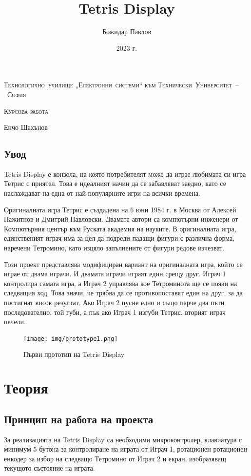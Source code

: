 \documentclass[titlepage, oneside, 12pt]{book}
\author{Божидар Павлов}
\title{Tetris Display}
\date{2023 г.}
\renewcommand{\maketitle}
{
    \begin{titlepage}
        \centering
        {\large\scshape Технологично~училище „Електронни~системи“ към Технически~Университет~–~София\par}
        \vfill
        {\LARGE\scshape\mdseries Курсова работа\par}
        \vspace{1cm}
        {\Huge\bfseries\thetitle\par}
        \vfill
        {\Large\theauthor \hfill Енчо Шахънов\par}
        \vspace{1cm}
        {\large\thedate\par}
    \end{titlepage}
}
\begin{document}
\maketitle

\setcounter{page}{2}

\section{Увод}

\textmd{Tetris Display} е конзола, на която потребителят може да играе любимата си игра
\textmd{Тетрис} с приятел. Това е идеалният начин да се забавляват заедно, като се
наслаждават на една от най-популярните игри на всички времена.

Оригиналната игра Тетрис е създадена на 6 юни 1984 г. в Москва от Алексей
Пажитнов и Дмитрий Павловски. Двамата автори са компютърни инженери от
Компютърния център към Руската академия на науките. В оригиналната игра,
единственият играч има за цел да подреди падащи фигури с различна форма,
наречени Тетромино, като изцяло запълнените от фигури редове изчезват.

Този проект представлява модифициран вариант на оригиналната игра, който се играе от двама играчи.
И двамата играчи играят един срещу друг. Играч 1 контролира самата игра, а Играч 2 управлява кое Тетроминота
ще се появи на следващия ход. Това значи, че трябва да се противопоставят един на
друг, за да постигнат висок резултат. Ако Играч 2 пусне
едно и също парче два пъти последователно, той губи, а пък ако Играч 1 изгуби \textmd{Тетрис},
вторият играч печели.

\vfill

\begin{figure}[h!]
    \centering
    \texttt{[image: img/prototype1.png]}
    \caption{Първи прототип на \textmd{Tetris Display}}
\end{figure}

\chapter{Теория}

\section{Принцип на работа на проекта}

За реализацията на \textmd{Tetris Display} са необходими микроконтролер,
клавиатура с минимум 5 бутона за контролиране на играта от Играч 1, ротационен
ротационен енкодер за избор на следващо Тетромино от Играч 2 и екран, изобразяващ текущото
състояние на играта.
\end{document}
